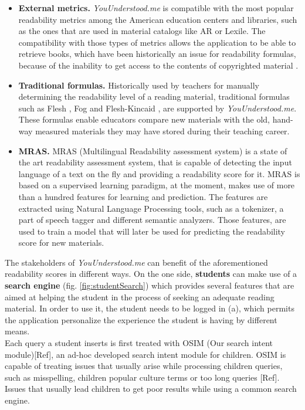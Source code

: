 \documentclass{sig-alternate-05-2015}
\begin{document}
\begin{itemize}
\item \textbf{External metrics.} \textit{YouUnderstood.me} is compatible with the most popular readability metrics among the American education centers and libraries, such as the ones that are used in material catalogs like AR or Lexile. The compatibility with those types of metrics allows the application to be able to retrieve books, which have been historically an issue for readability formulas, because of the inability to get access to the contents of copyrighted material \cite{denning2015readability}.
\item \textbf{Traditional formulas.} Historically used by teachers for manually determining the readability level of a reading material, traditional formulas such as Flesh \cite{flesch1948new}, Fog\cite{gunning1952technique} and Flesh-Kincaid \cite{flesch1948new}, are supported by \textit{YouUnderstood.me}. These formulas enable educators compare new materials with the old, hand-way measured materials they may have stored during their teaching career.
\item \textbf{MRAS.} MRAS \cite{imadrazo2016readability} (Multilingual Readability assessment system) is a state of the art readability assessment system, that is capable of detecting the input language of a text on the fly and providing a readability score for it. MRAS is based on a supervised learning paradigm, at the moment, makes use of more than a hundred features for learning and prediction. The features are extracted using Natural Language Processing tools, such as a tokenizer, a part of speech tagger and different semantic analyzers. Those features, are used to train a model that will later be used for predicting the readability score for new materials.


\end{itemize}

The stakeholders of \textit{YouUnderstood.me} can benefit of the aforementioned readability scores in different ways. On the one side, \textbf{students} can make use of a \textbf{search engine} (fig. \ref{fig:studentSearch}) which provides several features that are aimed at helping the student in the process of seeking an adequate reading material. In order to use it, the student needs to be logged in (a), which permits the application personalize the experience the student is having by different means.\\

Each query a student inserts is first treated with {\color{red} OSIM (Our search intent module)[Ref]}, an ad-hoc developed search intent module for children. OSIM is capable of treating issues that usually arise while processing children queries, such as misspelling, children popular culture terms or too long queries [Ref]. Issues that usually lead children to get poor results while using a common search engine.\\
\end{document}
